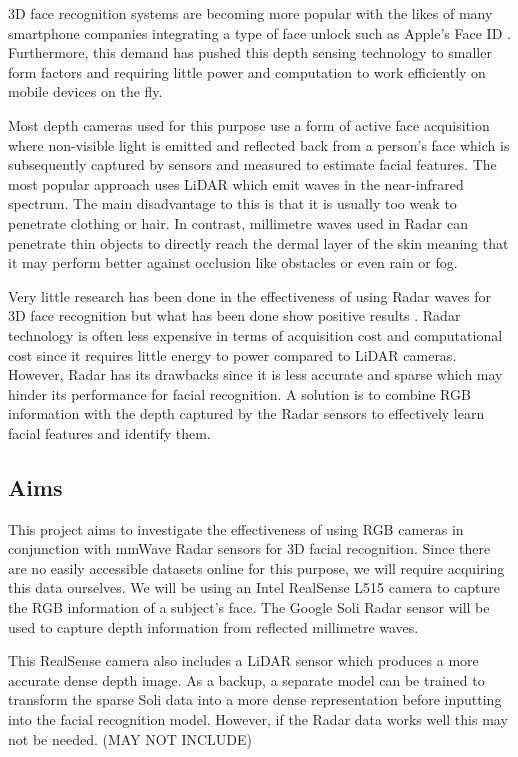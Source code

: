 \documentclass{interim}
\begin{document}
3D face recognition systems are becoming more popular with the likes of many smartphone companies integrating a type of face unlock such as Apple's Face ID \cite{apple-faceid}. Furthermore, this demand has pushed this depth sensing technology to smaller form factors and requiring little power and computation to work efficiently on mobile devices on the fly.

Most depth cameras used for this purpose use a form of active face acquisition where non-visible light is emitted and reflected back from a person's face which is subsequently captured by sensors and measured to estimate facial features. The most popular approach uses LiDAR which emit waves in the near-infrared spectrum. The main disadvantage to this is that it is usually too weak to penetrate clothing or hair. In contrast, millimetre waves used in Radar can penetrate thin objects to directly reach the dermal layer of the skin meaning that it may perform better against occlusion like obstacles or even rain or fog.

Very little research has been done in the effectiveness of using Radar waves for 3D face recognition but what has been done show positive results \cite{hof2020face, lim2020dnn,kim2020face, pho2021radar,challa2021face}. Radar technology is often less expensive in terms of acquisition cost and computational cost since it requires little energy to power compared to LiDAR cameras. However, Radar has its drawbacks since it is less accurate and sparse which may hinder its performance for facial recognition. A solution is to combine RGB information with the depth captured by the Radar sensors to effectively learn facial features and identify them.

\subsection{Aims}
This project aims to investigate the effectiveness of using RGB cameras in conjunction with mmWave Radar sensors for 3D facial recognition. Since there are no easily accessible datasets online for this purpose, we will require acquiring this data ourselves. We will be using an Intel RealSense L515 \cite{intel-l515} camera to capture the RGB information of a subject's face. The Google Soli Radar sensor \cite{lien2016soli} will be used to capture depth information from reflected millimetre waves. 

This RealSense camera also includes a LiDAR sensor which produces a more accurate dense depth image. As a backup, a separate model can be trained to transform the sparse Soli data into a more dense representation before inputting into the facial recognition model. However, if the Radar data works well this may not be needed. (MAY NOT INCLUDE)
\end{document}
